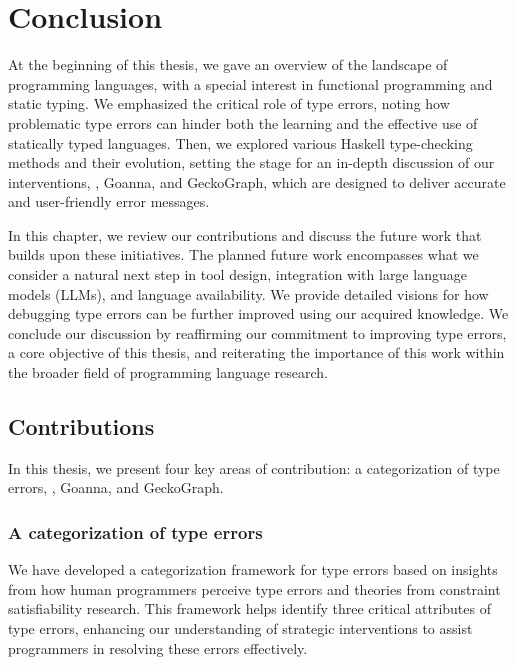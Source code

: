 

\chapter{Conclusion}

\label{chap:conclusion} 
\newcommand{\typetutor}{TypeTutor}

\graphicspath{{Figures/Conclusion}}
At the beginning of this thesis, we gave an overview of the landscape of programming languages, with a special interest in functional programming and static typing. We emphasized the critical role of type errors, noting how problematic type errors can hinder both the learning and the effective use of statically typed languages. Then, we explored various Haskell type-checking methods and their evolution, setting the stage for an in-depth discussion of our interventions, \chameleon{}, Goanna, and GeckoGraph, which are designed to deliver accurate and user-friendly error messages.

In this chapter, we review our contributions and discuss the future work that builds upon these initiatives. The planned future work encompasses what we consider a natural next step in tool design, integration with large language models (LLMs), and language availability. We provide detailed visions for how debugging type errors can be further improved using our acquired knowledge. We conclude our discussion by reaffirming our commitment to improving type errors, a core objective of this thesis, and reiterating the importance of this work within the broader field of programming language research.


\section{Contributions}

In this thesis, we present four key areas of contribution: a categorization of type errors, \chameleon{}, Goanna, and GeckoGraph. 

\subsection*{A categorization of type errors}


We have developed a categorization framework for type errors based on insights from how human programmers perceive type errors and theories from constraint satisfiability research. This framework helps identify three critical attributes of type errors, enhancing our understanding of strategic interventions to assist programmers in resolving these errors effectively.

